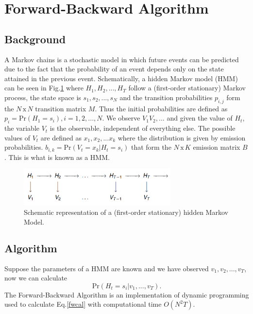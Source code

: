\section{Forward-Backward Algorithm}
\subsection{Background}
A Markov chains is a stochastic model in which future events can be predicted due to the fact that the probability of an event depends only on the state attained in the previous event. Schematically, a hidden Markov model (HMM) can be seen in Fig.\ref{markove_diagram} where $H_1, H_2, ... , H_T$ follow a (first-order stationary) Markov process, the state space is ${s_1, s_2, ... , s_N}$ and the transition probabilities $p_{i,j}$ form the $N \, \textrm{x} \, N$ transition matrix $M$. Thus the initial probabilities are defined as $p_i = \textrm{Pr}(H_1 = s_i ), i = 1, 2, ... , N$. We observe $V_1 V_2, ... $ and given the value of $H_t$, the variable $V_t$ is the observable, independent of
everything else. The possible values of $V_t$ are defined as ${x_1, x_2, ... x_k}$ where the distribution is given by emission probabilities. $b_{i,k} = \textrm{Pr}(V_t = x_k | H_t = s_i )$ that form the $N \, \textrm{x} \, K$ emission
matrix $B$. This is what is known as a HMM.



\begin{figure}[ht] 				
   \centering											%
   \includegraphics[width=8cm]{Figures/markov_process.png} 			%
   \caption{Schematic representation of a (first-order stationary) hidden Markov Model.}		%
   \label{markove_diagram}								%
\end{figure}

\subsection{Algorithm}
Suppose the parameters of a HMM are known and we have
observed $v_1, v_2, ... ,v_T$, now we can calculate 
\begin{equation}\label{fwcal}
\textrm{Pr}(H_t=s_i|v_1,...,v_T).
\end{equation}
The Forward-Backward Algorithm is an implementation of dynamic programming used to calculate Eq.\ref{fwcal} with computational time $O(N^2T)$.

